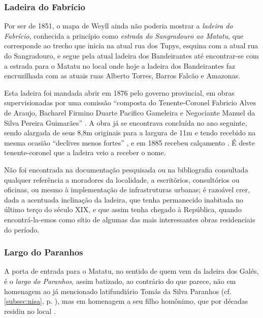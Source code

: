 \subsubsection{Ladeira do Fabrício}\label{subsubsec:fabricio}

Por ser de 1851, o mapa de Weyll ainda não poderia mostrar a \textit{ladeira do Fabrício}, conhecida a princípio como \textit{estrada do Sangradouro ao Matatu}, que corresponde ao trecho que inicia na atual rua dos Tupys, esquina com a atual rua do Sangradouro, e segue pela atual ladeira dos Bandeirantes até encontrar-se com a estrada para o Matatu no local onde hoje a ladeira dos Bandeirantes faz encruzilhada com as atuais ruas Alberto Torres, Barros Falcão e Amazonas. 

Esta ladeira foi mandada abrir em 1876 pelo governo provincial, em obras supervisionadas por uma comissão ``composta do Tenente-Coronel Fabricio Alves de Araujo, Bacharel Firmino Duarte Pacifico Gameleira e Negociante Manuel da Silva Pereira Guimarães'' \cite[p.~23]{bahia_1878}. A obra já se encontrava concluída no ano seguinte, sendo alargada de seus 8,8m originais para a largura de 11m e tendo recebido na mesma ocasião ``declives menos fortes'' \cite[p.~228]{bahia_1879}, e em 1885 recebeu calçamento \cite[p.~11]{bahia_1885}. É deste tenente-coronel que a ladeira veio a receber o nome.

Não foi encontrada na documentação pesquisada ou na bibliografia consultada qualquer referência a moradores da localidade, a escritõrios, consultórios ou oficinas, ou mesmo à implementação de infrastruturas urbanas; é razoável crer, dada a acentuada inclinação da ladeira, que tenha permanecido inabitada no último terço do século XIX, e que assim tenha chegado à República, quando encontrá-la-emos como sítio de algumas das mais interessantes obras residenciais do período.

\subsubsection{Largo do Paranhos}\label{subsubsec:paranhos}

A porta de entrada para o Matatu, no sentido de quem vem da ladeira dos Galés, é o \textit{largo do Paranhos}, assim batizado, ao contrário do que parece, não em homenagem ao já mencionado latifundiário Tomás da Silva Paranhos (cf. \autoref{subsec:nisa}, p. \pageref{subsec:nisa}), mas em homenagem a seu filho homônimo, que por décadas residiu no local \cite{dorea_ruas_1999}.

